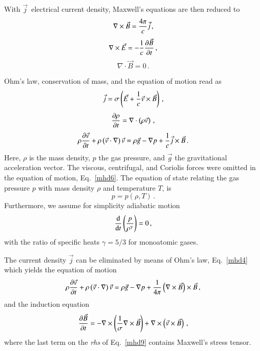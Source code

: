 With $\vec j$\, electrical current density, Maxwell's equations are then reduced to
\begin{equation}
\nabla\times\vec B = {4\pi\over c}\vec j\,,
\label{mhd1}
\end{equation}
%
\begin{equation}
\nabla\times\vec E = -{1\over c}{\partial\vec B\over\partial t}\,,
\label{mhd2}
\end{equation}
\begin{equation}
\nabla\cdot\vec B=0\,.
\label{mhd3}
\end{equation}
%

Ohm's law, conservation of mass, and the equation of motion read as
\begin{equation}
\vec j = \sigma\left(\vec E + {1\over c}\vec v\times\vec B\right)\,,
\label{mhd4}
\end{equation}
\begin{equation}
{\partial\rho\over\partial t} = \nabla\cdot\left(\rho\vec v\right)\,,
\label{mhd5}
\end{equation}
\begin{equation}
\rho{\partial\vec v\over\partial t} + \rho\left(\vec v\cdot\nabla\right)\vec v = \rho\vec g - \nabla p +{1\over c}\vec j\times\vec B\,.
\label{mhd6}
\end{equation}
Here, $\rho$ is the mass density, $p$ the gas pressure, and $\vec g$ the gravitational acceleration vector. The viscous, centrifugal, and Coriolis forces were omitted in the equation of motion, Eq.~\ref{mhd6}. The equation of state relating the gas pressure $p$ with mass density $\rho$ and temperature $T$, is
\begin{equation}
p = p\left(\rho,T\right)\,.
\label{mhd7}
\end{equation}
Furthermore, we assume for simplicity adiabatic motion
\begin{equation}
{\mathrm d\over\mathrm dt}\left({p\over\rho^\gamma}\right) = 0\,,
\label{mhd8}
\end{equation}
with the ratio of specific heats $\gamma=5/3$ for monoatomic gases.
%

The current density $\vec j$ can be eliminated by means of Ohm's law, Eq.~\ref{mhd4} which yields the equation of motion
\begin{equation}
\rho{\partial\vec v\over\partial t} + \rho\left(\vec v\cdot\nabla\right)\vec v = \rho\vec g - \nabla p +{1\over4\pi}\left(\nabla\times\vec B\right)\times\vec B\,,
\label{mhd9}
\end{equation}
and the induction equation
\begin{equation}
{\partial\vec B\over\partial t} = - \nabla\times\left({1\over\sigma}\nabla\times\vec B\right) + \nabla\times\left(\vec v\times\vec B\right)\,,
\label{mhd10}
\end{equation}
where the last term on the {\em rhs} of Eq.~\ref{mhd9} contains Maxwell's stress tensor.

